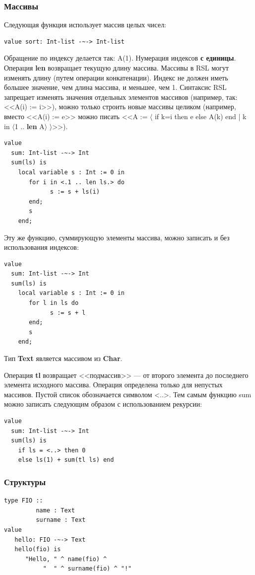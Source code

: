 \documentclass[14pt, twoside]{extreport}
\newcommand{\head}[1]{\vspace{1cm}\subsubsection*{#1}}
\begin{document}

\head{Массивы}
Следующая функция использует массив целых чисел:
\begin{lstlisting}
value sort: Int-list -~-> Int-list
\end{lstlisting}

Обращение по индексу делается так: A(1). Нумерация индексов \textbf{с единицы}. Операция \textbf{len} возвращает текущую длину массива. Массивы в RSL могут изменять длину (путем операции конкатенации). Индекс не должен иметь большее значение, чем длина массива, и меньшее, чем 1. Синтаксис RSL запрещает изменять значения отдельных элементов массивов (например, так: <<A(i) := i>>), можно только строить новые массивы целиком (например, вместо <<A(i) := e>> можно писать <<A := $\langle$ if k=i then e else A(k) end | k in $\langle$1 .. \textbf{len} A$\rangle$ $\rangle$>>).

\begin{lstlisting}
value
  sum: Int-list -~-> Int
  sum(ls) is
    local variable s : Int := 0 in
       for i in <.1 .. len ls.> do
             s := s + ls(i)
       end;
       s
    end;
\end{lstlisting}


Эту же функцию, суммирующую элементы массива, можно записать и без использования индексов:
\begin{lstlisting}
value
  sum: Int-list -~-> Int
  sum(ls) is
    local variable s : Int := 0 in
       for l in ls do
             s := s + l
       end;
       s
    end;
\end{lstlisting}

Тип \textbf{Text} является массивом из \textbf{Char}.

Операция \textbf{tl} возвращает <<подмассив>> --- от второго элемента до последнего элемента исходного массива. Операция определена только для непустых массивов. Пустой список обозначается символом <..>. Тем самым функцию sum можно записать следующим образом с использованием рекурсии:
\begin{lstlisting}
value
  sum: Int-list -~-> Int
  sum(ls) is
    if ls = <..> then 0
    else ls(1) + sum(tl ls) end
\end{lstlisting}


\head{Структуры}
\begin{lstlisting}
type FIO ::
         name : Text
         surname : Text
value
   hello: FIO -~-> Text
   hello(fio) is
      "Hello, " ^ name(fio) ^
           "  " ^ surname(fio) ^ "!"
\end{lstlisting}
\end{document}
